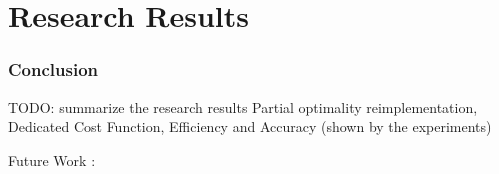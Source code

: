 \section{Research Results}
\frame{\tableofcontents[currentsection]}


\begin{frame}
    \frametitle{Conclusion}
    TODO: summarize the research results
    Partial optimality reimplementation, 
    Dedicated Cost Function,
    Efficiency and Accuracy (shown by the experiments) 
    
    Future Work :
\end{frame}

